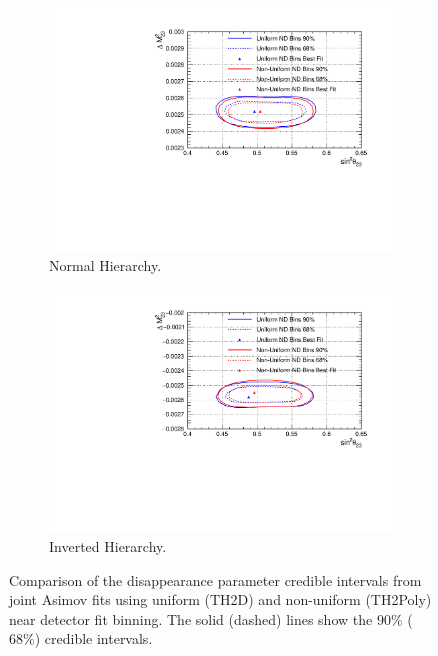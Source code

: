 \begin{figure}
\centering
\begin{subfigure}{.7\textwidth}
  \centering
  \includegraphics[width=0.95\linewidth]{figs/comparedmach3contours_PolyvsTH2DKevin/comparedmach3contours_RCeff_asimovA_NH}
  \caption{Normal Hierarchy.}
  \label{fig:TH2DPolyDisNH}
\end{subfigure}
\begin{subfigure}{.7\textwidth}
  \centering
  \includegraphics[width=0.95\linewidth]{figs/comparedmach3contours_PolyvsTH2DKevin/comparedmach3contours_RCeff_asimovA_IH}
  \caption{Inverted Hierarchy.}
  \label{fig:TH2DPolyDisIH}
\end{subfigure}
\caption{Comparison of the disappearance parameter credible intervals from joint Asimov fits using uniform (TH2D) and non-uniform (TH2Poly) near detector fit binning. The solid (dashed) lines show the 90$\%$ ($68\%$) credible intervals.}
\label{fig:TH2DPolyDis}
\end{figure}

